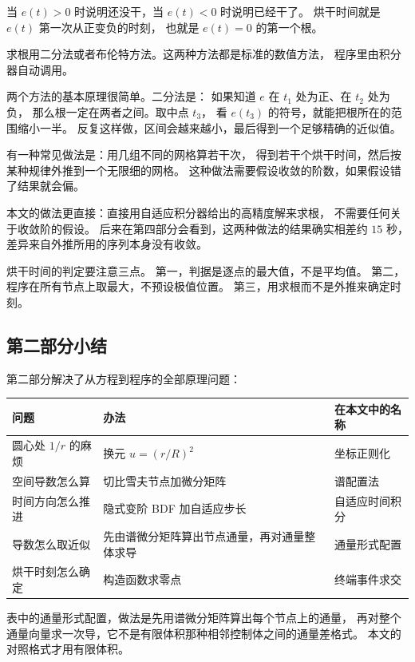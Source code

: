 当 $e(t)>0$ 时说明还没干，当 $e(t)<0$ 时说明已经干了。
烘干时间就是 $e(t)$ 第一次从正变负的时刻，
也就是 $e(t)=0$ 的第一个根。

求根用二分法或者布伦特方法。这两种方法都是标准的数值方法，
程序里由积分器自动调用。

两个方法的基本原理很简单。二分法是：
如果知道 $e$ 在 $t_1$ 处为正、在 $t_2$ 处为负，
那么根一定在两者之间。取中点 $t_3$，
看 $e(t_3)$ 的符号，就能把根所在的范围缩小一半。
反复这样做，区间会越来越小，最后得到一个足够精确的近似值。

有一种常见做法是：用几组不同的网格算若干次，
得到若干个烘干时间，然后按某种规律外推到一个无限细的网格。
这种做法需要假设收敛的阶数，如果假设错了结果就会偏。

本文的做法更直接：直接用自适应积分器给出的高精度解来求根，
不需要任何关于收敛阶的假设。
后来在第四部分会看到，这两种做法的结果确实相差约 $15$ 秒，
差异来自外推所用的序列本身没有收敛。

\keypoint
烘干时间的判定要注意三点。
第一，判据是逐点的最大值，不是平均值。
第二，程序在所有节点上取最大，不预设极值位置。
第三，用求根而不是外推来确定时刻。

\subsection{第二部分小结}

第二部分解决了从方程到程序的全部原理问题：

\begin{center}
\begin{tabular}{@{}lll@{}}
\toprule
问题 & 办法 & 在本文中的名称 \\
\midrule
圆心处 $1/r$ 的麻烦 & 换元 $u=(r/R)^2$ & 坐标正则化 \\
空间导数怎么算 & 切比雪夫节点加微分矩阵 & 谱配置法 \\
时间方向怎么推进 & 隐式变阶 BDF 加自适应步长 & 自适应时间积分 \\
导数怎么取近似 & 先由谱微分矩阵算出节点通量，再对通量整体求导 & 通量形式配置 \\
烘干时刻怎么确定 & 构造函数求零点 & 终端事件求交 \\
\bottomrule
\end{tabular}
\end{center}

表中的通量形式配置，做法是先用谱微分矩阵算出每个节点上的通量，
再对整个通量向量求一次导，它不是有限体积那种相邻控制体之间的通量差格式。
本文的对照格式才用有限体积。

